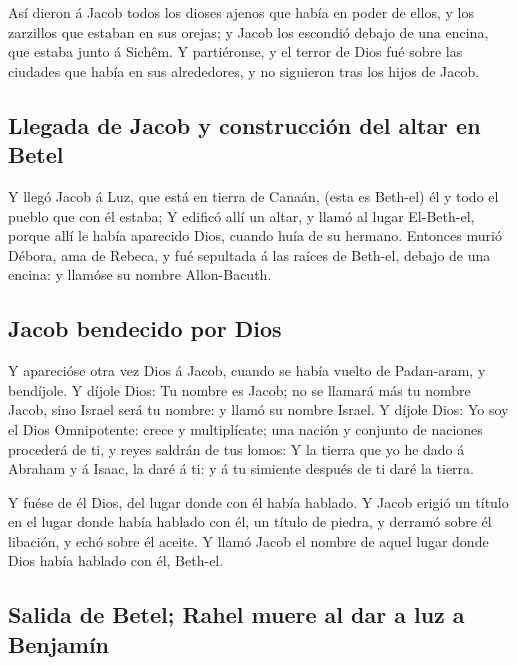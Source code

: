  Así dieron á Jacob todos los dioses ajenos que había en
poder de ellos, y los zarzillos que estaban en sus orejas; y Jacob los
escondió debajo de una encina, que estaba junto á Sichêm.  Y
partiéronse, y el terror de Dios fué sobre las ciudades que había en sus
alrededores, y no siguieron tras los hijos de Jacob.

\hypertarget{llegada-de-jacob-y-construcciuxf3n-del-altar-en-betel}{%
\subsection{Llegada de Jacob y construcción del altar en
Betel}\label{llegada-de-jacob-y-construcciuxf3n-del-altar-en-betel}}

 Y llegó Jacob á Luz, que está en tierra de Canaán, (esta es
Beth-el) él y todo el pueblo que con él estaba;  Y edificó
allí un altar, y llamó al lugar El-Beth-el, porque allí le había
aparecido Dios, cuando huía de su hermano.  Entonces murió
Débora, ama de Rebeca, y fué sepultada á las raíces de Beth-el, debajo
de una encina: y llamóse su nombre Allon-Bacuth.

\hypertarget{jacob-bendecido-por-dios}{%
\subsection{Jacob bendecido por Dios}\label{jacob-bendecido-por-dios}}

 Y aparecióse otra vez Dios á Jacob, cuando se había vuelto
de Padan-aram, y bendíjole.  Y díjole Dios: Tu nombre es
Jacob; no se llamará más tu nombre Jacob, sino Israel será tu nombre: y
llamó su nombre Israel.  Y díjole Dios: Yo soy el Dios
Omnipotente: crece y multiplícate; una nación y conjunto de naciones
procederá de ti, y reyes saldrán de tus lomos:  Y la tierra
que yo he dado á Abraham y á Isaac, la daré á ti: y á tu simiente
después de ti daré la tierra.

 Y fuése de él Dios, del lugar donde con él había hablado.
 Y Jacob erigió un título en el lugar donde había hablado
con él, un título de piedra, y derramó sobre él libación, y echó sobre
él aceite.  Y llamó Jacob el nombre de aquel lugar donde
Dios había hablado con él, Beth-el.

\hypertarget{salida-de-betel-rahel-muere-al-dar-a-luz-a-benjamuxedn}{%
\subsection{Salida de Betel; Rahel muere al dar a luz a
Benjamín}\label{salida-de-betel-rahel-muere-al-dar-a-luz-a-benjamuxedn}}

